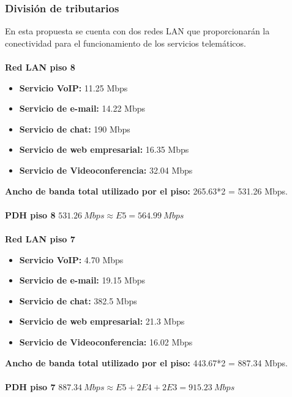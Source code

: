\documentclass[12pt,letterpaper]{article}
\begin{document}
\subsubsection{División de tributarios}
En esta propuesta se cuenta con dos redes LAN que proporcionarán la conectividad para 
el funcionamiento de los servicios telemáticos.
\\ \\
\textbf{Red LAN piso 8}
\begin{itemize}
    \item \textbf{Servicio VoIP:} 11.25 Mbps
    \item \textbf{Servicio de e-mail: }14.22 Mbps
    \item \textbf{Servicio de chat: } 190 Mbps
    \item \textbf{Servicio de web empresarial: } 16.35 Mbps
    \item \textbf{Servicio de Videoconferencia: } 32.04 Mbps
\end{itemize}
\textbf{Ancho de banda total utilizado por el piso: }265.63*2 = 531.26 Mbps.
\\ \\
\textbf{PDH piso 8}
\newline
$531.26 \ Mbps \approx E5 = 564.99 \ Mbps$
\\ \\
\textbf{Red LAN piso 7}
\begin{itemize}
    \item \textbf{Servicio VoIP:} 4.70 Mbps
    \item \textbf{Servicio de e-mail: } 19.15 Mbps
    \item \textbf{Servicio de chat: } 382.5 Mbps
    \item \textbf{Servicio de web empresarial: } 21.3 Mbps
    \item \textbf{Servicio de Videoconferencia: } 16.02 Mbps
\end{itemize}
\textbf{Ancho de banda total utilizado por el piso: }443.67*2 = 887.34 Mbps.
\\ \\
\textbf{PDH piso 7}
\newline
$887.34 \ Mbps \approx E5 + 2E4+2E3 = 915.23 \ Mbps$
\\ \\
\end{document}
